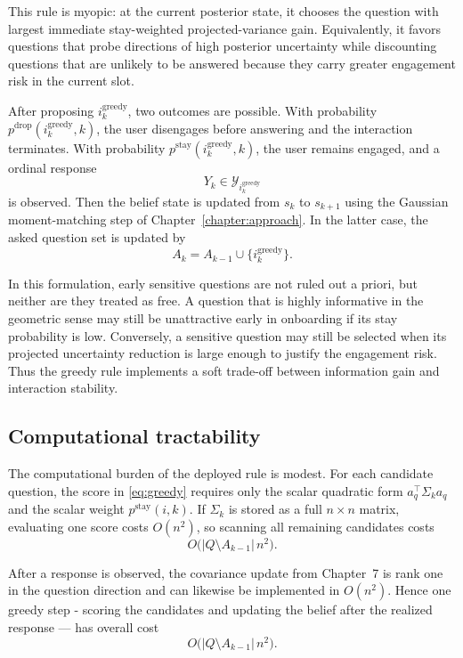 \documentclass{article}
\begin{document}
This rule is myopic: at the current posterior state, it chooses the question with
largest immediate stay-weighted projected-variance gain. Equivalently, it favors
questions that probe directions of high posterior uncertainty while discounting
questions that are unlikely to be answered because they carry greater engagement
risk in the current slot.

After proposing $i_k^{\text{greedy}}$, two outcomes are possible. With probability
$p^{\text{drop}}(i_k^{\text{greedy}},k)$, the user disengages before answering and
the interaction terminates. With probability
$p^{\text{stay}}(i_k^{\text{greedy}},k)$, the user remains engaged, and a ordinal
response
\begin{equation*}
Y_k \in \mathcal Y_{i_k^{\text{greedy}}}
\end{equation*}
is observed. Then the belief state is updated from $s_k$ to $s_{k+1}$ using the
Gaussian moment-matching step of Chapter~\ref{chapter:approach}. In the latter case, the asked question
set is updated by
\begin{equation*}
A_k = A_{k-1}\cup\{i_k^{\text{greedy}}\}.
\end{equation*}

In this formulation, early sensitive questions are not ruled out a
priori, but neither are they treated as free. A question that is highly informative
in the geometric sense may still be unattractive early in onboarding if its stay
probability is low. Conversely, a sensitive question may still be selected when its
projected uncertainty reduction is large enough to justify the engagement risk. Thus
the greedy rule implements a soft trade-off between information gain and interaction
stability.

\subsection{Computational tractability}

The computational burden of the deployed rule is modest. For each candidate question,
the score in \eqref{eq:greedy} requires only the scalar quadratic form $a_q^\top \Sigma_k a_q$
and the scalar weight $p^{\text{stay}}(i,k)$. If $\Sigma_k$ is stored as a full
$n\times n$ matrix, evaluating one score costs $O(n^2)$, so scanning all remaining
candidates costs
\begin{equation*}
O\bigl(|Q\setminus A_{k-1}|\,n^2\bigr).
\end{equation*}

After a response is observed, the covariance update from Chapter~7 is rank one in
the question direction and can likewise be implemented in $O(n^2)$. Hence one greedy
step - scoring the candidates and updating the belief after the realized response —
has overall cost
\begin{equation*}
O\bigl(|Q\setminus A_{k-1}|\,n^2\bigr).
\end{equation*}
\end{document}

